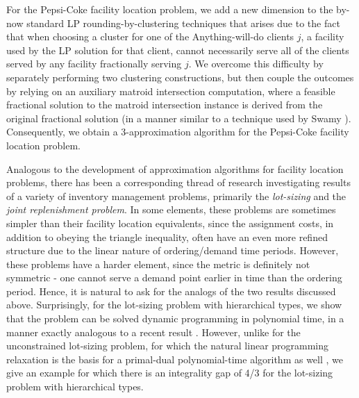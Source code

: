 For the Pepsi-Coke facility location problem, we add a new dimension to the by-now standard LP rounding-by-clustering techniques that arises due to the fact that when choosing a cluster for one of the Anything-will-do clients $j$, a facility used by the LP solution for that client, cannot necessarily serve all of the clients served by any facility fractionally serving $j$. We overcome this difficulty by separately performing two clustering constructions,  but then couple the outcomes by relying on an auxiliary matroid intersection computation, where a feasible fractional solution to the matroid intersection instance is derived from the original fractional solution (in a manner similar to a technique used by Swamy \cite{swamy2013improved}). Consequently, we obtain a 3-approximation algorithm for the Pepsi-Coke facility location problem.

Analogous to the development of approximation algorithms for facility location problems,
there has been a corresponding thread of research investigating results of a variety of
inventory management problems, primarily the {\it lot-sizing} and the {\it joint
  replenishment
  problem}\cite{levi2008approximation,levi2008constant,levi2006primal,ApproxjrpD:Beinkowski,cheung2014submodular}. In
some elements, these problems are sometimes simpler than their facility location
equivalents, since the assignment costs, in addition to obeying the triangle inequality,
often have an even more refined structure due to the linear nature of ordering/demand time
periods. However, these problems have a harder element, since the metric is definitely not
symmetric - one cannot serve a demand point earlier in time than the ordering
period. Hence, it is natural to ask for the analogs of the two results discussed above. Surprisingly, for the lot-sizing problem with hierarchical types, we show that the problem can be solved dynamic programming in polynomial time, in a manner exactly analogous to a recent result \cite{cheung2014submodular}. However, unlike for the unconstrained lot-sizing problem, for which the natural linear programming relaxation is the basis for a primal-dual polynomial-time algorithm as well \cite{levi2006primal},
we give an example for which there is an integrality gap of 4/3 for the lot-sizing problem with hierarchical types.
